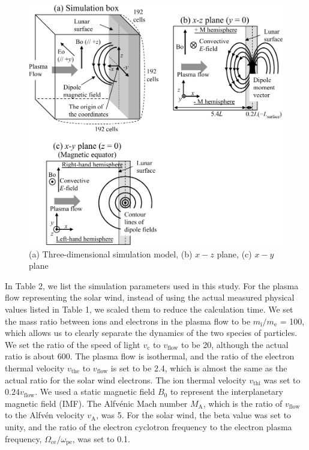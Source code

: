 \documentclass[draft,jgrga]{agutex2015}
\begin{document}
\begin{article}
\begin{figure}[t]
 \centering
 \noindent\includegraphics[]{./figures/Fig_1_bb-crop.pdf}
 \caption{(a) Three-dimensional simulation model, (b) $x-z$ plane, (c) $x-y$ plane}\label{fig:1}
\end{figure}


In Table 2, 
we list the simulation parameters used in this study. 
For the plasma flow representing the solar wind, 
instead of using the actual measured physical values listed in Table 1, 
we scaled them to reduce the calculation time. 
We set the mass ratio between ions and electrons in the plasma flow 
to be $ m_\mathrm{i}/ m_\mathrm{e}$ = 100, which allows us 
to clearly separate the dynamics of the two species of particles. 
We set the ratio of the speed of light $v_\mathrm{c}$ to 
$v_\mathrm{flow}$ to be 20, 
although the actual ratio is about 600. 
The plasma flow is isothermal, and 
the ratio of the electron thermal velocity 
$v_\mathrm{the}$ to $v_\mathrm{flow}$ is set to be 2.4, 
which is almost the same as the actual ratio for the solar wind electrons. 
The ion thermal velocity $v_\mathrm{thi}$ was set to $0.24v_\mathrm{flow}$.
We used a static magnetic field $B_0$ to represent the interplanetary magnetic field (IMF). 
The Alfv\'{e}nic Mach number $M_\mathrm{A}$, which is the ratio of $v_\mathrm{flow}$ to 
the Alfv\'{e}n velocity $v_\mathrm{A}$, was 5. 
For the solar wind, the beta value was set to unity, and the ratio of 
the electron cyclotron frequency to
the electron plasma frequency,
$\Omega_\mathrm{ce} / \omega_\mathrm{pe}$, 
was set to 0.1. 


\end{article}
\end{document}
